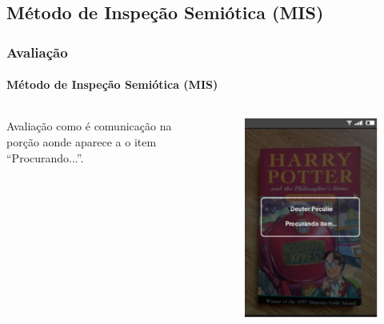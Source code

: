 \documentclass[14pt,beamer]{beamer}
\begin{document}
\subsection{Método de Inspeção Semiótica (MIS)}
\begin{frame}
	\frametitle{Avaliação}
	\framesubtitle{Método de Inspeção Semiótica (MIS)}

    \begin{columns}
        \begin{column}{.6\textwidth}
            Avaliação como é comunicação na porção aonde aparece a o item 
            ``Procurando...''.
        \end{column}
        \begin{column}{.4\textwidth}
            \begin{figure}
                \centering
                \includegraphics[scale=.5]{tela/TelaBuscando}
            \end{figure}
        \end{column}
    \end{columns}
\end{frame}
\end{document}
